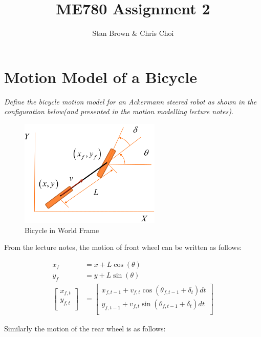 \documentclass{article}
\begin{document}
\title{ME780 Assignment 2}
\author{Stan Brown \& Chris Choi}
\date{}
\maketitle

\section{Motion Model of a Bicycle}
\textit{Define the bicycle motion model for an Ackermann steered robot as shown in the configuration below(and presented in the motion modelling lecture notes). }
\begin{figure}[H]
	\centering
	\includegraphics[width=0.6\textwidth]{images/bicycle_model.png}
	\caption{Bicycle in World Frame}
	\label{fig:bicycle}
\end{figure}

From the lecture notes, the motion of front wheel can be written as follows:

\begin{align}
	x_{f} &= x + L \cos(\theta) \\
	y_{f} &= y + L \sin(\theta) \\
 	\begin{bmatrix}
        x_{f, t} \\
        y_{f, t} \\
    \end{bmatrix}  
    &=
    \begin{bmatrix}
	    x_{f, t - 1} + v_{f, t} \cos(\theta_{f, t - 1} + \delta_{t}) dt \\
		y_{f, t - 1} + v_{f, t} \sin(\theta_{f, t - 1} + \delta_{t}) dt \\
    \end{bmatrix}
\end{align}

Similarly the motion of the rear wheel is as follows: 
\end{document}
